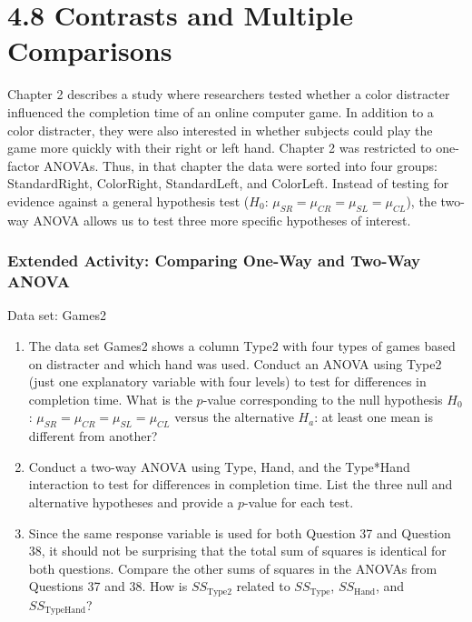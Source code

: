 \documentclass[
]{report}
\begin{document}
\chapter{4.8 Contrasts and Multiple Comparisons}\label{contrasts-and-multiple-comparisons}

Chapter 2 describes a study where researchers tested whether a color distracter influenced the completion time of an online computer game. In addition to a color distracter, they were also interested in whether subjects could play the game more quickly with their right or left hand. Chapter 2 was restricted to one-factor ANOVAs. Thus, in that chapter the data were sorted into four groups: StandardRight, ColorRight, StandardLeft, and ColorLeft. Instead of testing for evidence against a general hypothesis test (\(H_0\): \(\mu_{SR} = \mu_{CR} = \mu_{SL} = \mu_{CL}\)), the two-way ANOVA allows us to test three more specific hypotheses of interest.

\subsection{Extended Activity: Comparing One-Way and Two-Way ANOVA}\label{extended-activity-comparing-one-way-and-two-way-anova}

Data set: Games2

\begin{enumerate}
\def\labelenumi{\arabic{enumi}.}
\setcounter{enumi}{36}
\item
  The data set Games2 shows a column Type2 with four types of games based on distracter and which hand was used. Conduct an ANOVA using Type2 (just one explanatory variable with four levels) to test for differences in completion time. What is the \(p\)-value corresponding to the null hypothesis \(H_0\): \(\mu_{SR} = \mu_{CR} = \mu_{SL} = \mu_{CL}\) versus the alternative \(H_a\): at least one mean is different from another?
\item
  Conduct a two-way ANOVA using Type, Hand, and the Type*Hand interaction to test for differences in completion time. List the three null and alternative hypotheses and provide a \(p\)-value for each test.
\item
  Since the same response variable is used for both Question 37 and Question 38, it should not be surprising that the total sum of squares is identical for both questions. Compare the other sums of squares in the ANOVAs from Questions 37 and 38. How is \(SS_{\text{Type2}}\) related to \(SS_{\text{Type}}\), \(SS_{\text{Hand}}\), and \(SS_{\text{TypeHand}}\)?
\end{enumerate}
\end{document}
